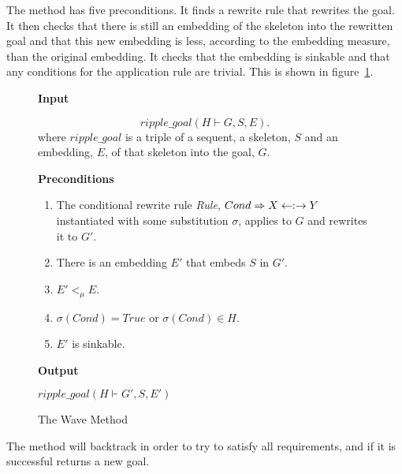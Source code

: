 The  method has five preconditions.  It finds a
rewrite rule that rewrites the goal.  It then checks that there is
still an embedding of the skeleton into the rewritten goal and that
this new embedding is less, according to the embedding measure, than
the original embedding.  It checks that the embedding is sinkable and
that any conditions for the application rule are trivial.  This is
shown in figure~\ref{fig:wave_method}.  
\begin{figure}[htb]
\pageline
\begin{center}
\begin{center}
\textbf{Input}

$$ripple\_goal(H \vdash G, S, E).$$
where $ripple\_goal$ is a triple of a sequent, a skeleton, $S$ and an
embedding, $E$, of that skeleton into the goal, $G$.
\end{center}
\begin{center}
\textbf{Preconditions}
\end{center}

\begin{enumerate}
\item The conditional
  rewrite rule \emph{Rule}, $Cond \Rightarrow X \leftarrow:\rightarrow Y$ instantiated
  with some substitution $\sigma$, applies to $G$
  and rewrites it to $G'$.
\item There is an embedding $E'$ that embeds $S$ in $G'$.
\item $E' <_{\mu} E$.
\item $\sigma(Cond) = True$ or $\sigma(Cond) \in H$.
\item $E'$ is sinkable.
\end{enumerate}
\begin{center}
\textbf{Output}
\end{center}
$ripple\_goal(H \vdash G', S, E')$
\end{center}
\vspace{1mm}
\pageline
\caption{The Wave Method}
\label{fig:wave_method}

\end{figure}
The method will backtrack in order to try to
satisfy all requirements, and if it is successful returns a new goal.


